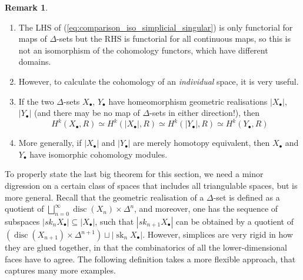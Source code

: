 \documentclass{tufte-handout}
\DeclareMathOperator{\disc}{disc}
\DeclareMathOperator{\sk}{sk}
\theoremstyle{definition}
\newtheorem*{rem}{Remark}
\begin{document}
\begin{rem}
\begin{enumerate}
\item The LHS of (\ref{eq:comparison_iso_simplicial_singular}) is only functorial for maps of $\Delta$-sets
but the RHS is functorial for all continuous maps, so this is not an isomorphism of the cohomology functors, which have different domains. 
\item However, to calculate the cohomology of an \emph{individual} space, it is very useful.

\item If the two $\Delta$-sets $X_\bullet$, $Y_\bullet$ have homeomorphism geometric realisations $|X_\bullet|$, $|Y_\bullet|$ (and there
may be no map of $\Delta$-sets in either direction!), then 
\[
H^k(X_\bullet,R) \simeq H^k(|X_\bullet|,R) \simeq H^k(|Y_\bullet|,R) \simeq H^k(Y_\bullet,R)
\]

\item More generally, if $|X_\bullet|$ and $|Y_\bullet|$ are merely homotopy equivalent, then $X_\bullet$ and $Y_\bullet$ have isomorphic cohomology modules.
\end{enumerate}
\end{rem}


To properly state the last big theorem for this section, we need a minor digression on a certain class
of spaces that includes all triangulable spaces, but is more general. Recall that the geometric realisation
of a $\Delta$-set is defined as a quotient of $\bigsqcup_{n=0}^\infty \disc(X_n) \times \Delta^n$, and 
moreover, one has the sequence of subspaces $|sk_nX_\bullet| \subseteq |X_\bullet|$, such that
$|sk_{n+1}X_\bullet|$ can be obtained by a quotient of $\left(\disc(X_{n+1}) \times \Delta^{n+1}\right) \sqcup |\sk_nX_\bullet|$. 
However, simplices are very rigid in how they are glued together, in that the combinatorics of all
the lower-dimensional faces have to agree. The following definition 
takes a more flexible approach, that captures many more examples.
\end{document}
